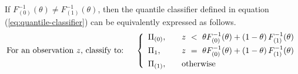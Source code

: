 \begin{lemma}
  \label{lem:decision-boundary}
  If $F_{(0)}^{-1}(\theta) \ne F_{(1)}^{-1}(\theta)$, then the quantile
  classifier defined in equation (\ref{eq:quantile-classifier}) can be
  equivalently expressed as follows.
  \begin{equation}
    \label{eq:alt-quantile-classifier}
    \text{For an observation $z$, classify to:} \hspace{5mm} \left\{ 
      \begin{array}{lcl}
        \Pi_{(0)}, & & z ~<~ \theta F_{(0)}^{-1}(\theta) +
                       (1 - \theta)\, F_{(1)}^{-1}(\theta) \\[1ex]
        \Pi_{1}, & & z ~=~ \theta F_{(0)}^{-1}(\theta) +
                       (1 - \theta)\, F_{(1)}^{-1}(\theta) \\[1ex]
        \Pi_{(1)}, & & \textup{otherwise}
      \end{array}
    \right.
  \end{equation}
\end{lemma}

